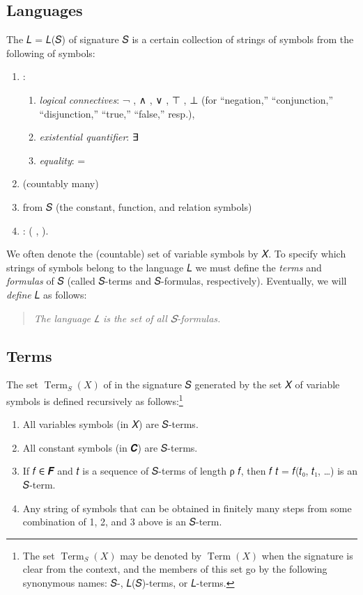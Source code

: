 \documentclass[a4paper,UKenglish,cleveref,autoref,thm-restate,12pt]{lipics-v2021-wjd}
\newcommand{\<}{\langle}
\renewcommand{\>}{\rangle}
\begin{document}
\subsection{Languages}\label{languages}
The  𝐿 = 𝐿(𝑆) of signature 𝑆 is a certain collection of strings
of symbols from the following  of symbols:
\begin{enumerate}
\item  {}:
  \begin{enumerate}
  \item \emph{logical connectives}: ¬ , ∧ , ∨ , ⊤ , ⊥ (for ``negation,''
    ``conjunction,'' ``disjunction,'' ``true,'' ``false,'' resp.),
  \item \emph{existential quantifier}: ∃
  \item \emph{equality}: =
  \end{enumerate}
\item {} (countably many)
\item {} from 𝑆 (the constant, function, and relation symbols)
\item {}: ( , ).
\end{enumerate}
We often denote the (countable) set of variable symbols by 𝑋.
To specify which strings of symbols belong to the language 𝐿 we must define the
\emph{terms} and \emph{formulas} of 𝑆 (called 𝑆-terms and 𝑆-formulas,
respectively). Eventually, we will \emph{define} 𝐿 as follows:
\begin{quote}
\emph{The language 𝐿 is the set of all 𝑆-formulas.}
\end{quote}





\subsection{Terms}\label{terms}
The set \(\operatorname{Term}_S(X)\) of  in
the signature 𝑆 generated by
the set 𝑋 of variable symbols is defined recursively as follows:\footnote{The
  set \(\operatorname{Term}_S(X)\) may be denoted by \(\operatorname{Term}(X)\)
  when the signature is clear from the context, and the members of this set go
  by the following synonymous names: 𝑆-, 𝐿(𝑆)-terms, or 𝐿-terms.}
\begin{enumerate}
\item All variables symbols (in 𝑋) are 𝑆-terms.
\item All constant symbols (in 𝑪) are 𝑆-terms.
\item If 𝑓 ∈ 𝑭 and 𝑡 is a sequence of 𝑆-terms of length ρ 𝑓, then 𝑓 𝑡 = 𝑓(𝑡₀, 𝑡₁, …) is an 𝑆-term.
\item Any string of symbols that can be obtained in finitely many steps from some
combination of 1, 2, and 3 above is an 𝑆-term.
\end{enumerate}
\end{document}
